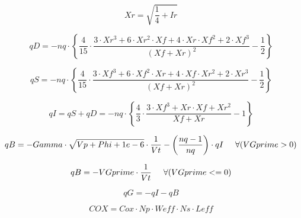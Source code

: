 \hspace{20mm}     \begin{equation}
			Xr = \sqrt{\dfrac{1}{4} + Ir}
                  \end{equation}  

\hspace{20mm}     \begin{equation}
			qD=-nq \cdot \left\lbrace  \dfrac{4}{15} \cdot \dfrac{3 \cdot Xr^{3} + 6 \cdot Xr^{2} \cdot Xf + 4 \cdot Xr \cdot Xf^{2} +2 \cdot Xf^{3} } { (Xf+Xr)^{2} } -\dfrac{1}{2} \right\rbrace  
                  \end{equation}  

\hspace{20mm}     \begin{equation}
			qS=-nq \cdot \left\lbrace  \dfrac{4}{15} \cdot \dfrac{3 \cdot Xf^{3} + 6 \cdot Xf^{2} \cdot Xr + 4 \cdot Xf \cdot Xr^{2} +2 \cdot Xr^{3} } { (Xf+Xr)^{2} } -\dfrac{1}{2} \right\rbrace  
                  \end{equation}  

\hspace{20mm}     \begin{equation}
			qI = qS+qD = -nq \cdot \left\lbrace  \dfrac{4}{3} \cdot \dfrac{3 \cdot Xf^{3} +  Xr \cdot Xf + Xr^{2} } { Xf+Xr } - 1 \right\rbrace  
                  \end{equation}  

\hspace{20mm}     \begin{equation} 
			qB = -Gamma \cdot \sqrt{Vp+Phi+1e-6} \cdot \dfrac{1}{
Vt} - \left( \dfrac{nq-1}{nq} \right) \cdot qI \hspace{5mm} \forall (VGprime > 0 )			
                  \end{equation}  

\hspace{20mm}     \begin{equation}
			qB = -VGprime \cdot \dfrac{1}{Vt} \hspace{5mm}\forall (VGprime <= 0 )
                  \end{equation}  

\hspace{20mm}     \begin{equation}
			qG = -qI - qB
                  \end{equation}  

\hspace{20mm}     \begin{equation}
			COX = Cox \cdot Np \cdot Weff \cdot Ns \cdot Leff
                  \end{equation}  

